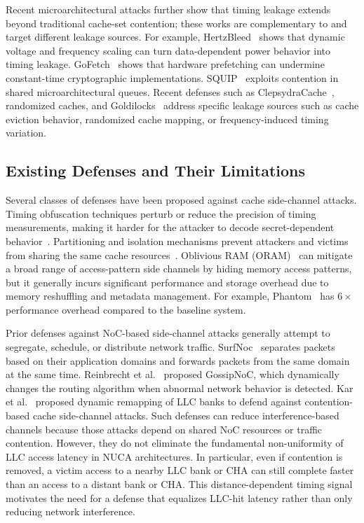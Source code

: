 Recent microarchitectural attacks further show that timing leakage extends beyond traditional cache-set contention; these works are complementary to \scheme{} and target different leakage sources.
For example, HertzBleed~\cite{hertzbleed} shows that dynamic voltage and frequency scaling can turn data-dependent power behavior into timing leakage.
GoFetch~\cite{gofetch} shows that hardware prefetching can undermine constant-time cryptographic implementations.
SQUIP~\cite{squip} exploits contention in shared microarchitectural queues.
Recent defenses such as ClepsydraCache~\cite{clepsydra}, randomized caches, and Goldilocks~\cite{goldilocks} address specific leakage sources such as cache eviction behavior, randomized cache mapping, or frequency-induced timing variation.

\subsection{Existing Defenses and Their Limitations} \label{sec:back_defenses}
Several classes of defenses have been proposed against cache side-channel attacks.
Timing obfuscation techniques perturb or reduce the precision of timing measurements, making it harder for the attacker to decode secret-dependent behavior~\cite{zhang2011predictive,godfrey2013server}.
Partitioning and isolation mechanisms prevent attackers and victims from sharing the same cache
resources~\cite{kiriansky2018dawg,liu2016catalyst,wang2007new,kim2012stealthmem}.
Oblivious RAM (ORAM)~\cite{oram,phantom,sanctum} can mitigate a broad range of access-pattern side channels by hiding memory access patterns, but it generally incurs significant performance and storage overhead due to memory reshuffling and metadata management.
For example, Phantom~\cite{phantom} has $6\times$ performance overhead compared to the baseline system.

Prior defenses against NoC-based side-channel attacks generally attempt to segregate, schedule, or distribute network traffic.
SurfNoc~\cite{wassel2013surfnoc} separates packets based on their application domains and forwards packets from the same domain at the same time.
Reinbrecht et al.~\cite{reinbrecht2016gossip} proposed GossipNoC, which dynamically changes the routing algorithm when abnormal network behavior is detected.
Kar et al.~\cite{remapping-llc} proposed dynamic remapping of LLC banks to defend against contention-based cache side-channel attacks.
Such defenses can reduce interference-based channels because those attacks depend on shared NoC resources or traffic contention.
However, they do not eliminate the fundamental non-uniformity of LLC access latency in NUCA architectures.
In particular, even if contention is removed, a victim access to a nearby LLC bank or CHA can still complete faster than an access to a distant bank or CHA.
This distance-dependent timing signal motivates the need for a defense that equalizes LLC-hit latency rather than only reducing network interference.


